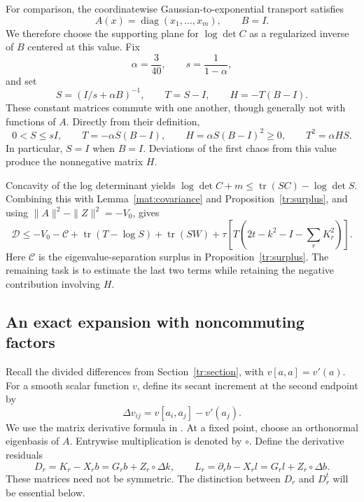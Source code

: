 \documentclass[11pt]{article}
\newcommand{\mathscr}[1]{\mathcal{#1}}
\DeclareMathOperator{\tr}{tr}
\newcommand{\Id}{I}
\theoremstyle{definition}
\theoremstyle{remark}
\numberwithin{equation}{section}
\begin{document}
For comparison, the coordinatewise Gaussian-to-exponential transport
satisfies
\[
 A(x)=\operatorname{diag}(x_1,\ldots,x_m),\qquad B=\Id.
\]
We therefore choose the supporting plane for $\log\det C$ as a
regularized inverse of $B$ centered at this value.  Fix
\begin{equation}\label{mat:dual-constants}
 \alpha=\frac{3}{40},\qquad s=\frac1{1-\alpha},
\end{equation}
and set
\begin{equation}\label{mat:dual-matrices}
 S=(\Id/s+\alpha B)^{-1},\qquad T=S-\Id,
 \qquad H=-T(B-\Id).
\end{equation}
These constant matrices commute with one another, though generally not
with functions of $A$.  Directly from their definition,
\begin{equation}\label{mat:dual-relations}
 0<S\le s\Id,\qquad T=-\alpha S(B-\Id),\qquad
 H=\alpha S(B-\Id)^2\ge0,\qquad T^2=\alpha HS.
\end{equation}
In particular, $S=\Id$ when $B=\Id$.  Deviations of the first chaos from
this value produce the nonnegative matrix $H$.

Concavity of the log determinant yields
$\log\det C+m\le\tr(SC)-\log\det S$.  Combining this with
Lemma~\ref{mat:covariance} and Proposition~\ref{tr:surplus}, and using
$\|A\|^2-\|Z\|^2=-V_0$, gives
\begin{equation}\label{mat:deficit-reduction}
 \mathscr D\le -V_0-\mathcal C+\tr(T-\log S)+\tr(SW)
   +\tau\left[T\left(2t-k^2-\Id-\sum_rK_r^2\right)\right].
\end{equation}
Here $\mathcal C$ is the eigenvalue-separation surplus in
Proposition~\ref{tr:surplus}.  The remaining task is to estimate the last
two terms while retaining the negative contribution involving $H$.

\subsection{An exact expansion with noncommuting factors}

Recall the divided differences from Section~\ref{tr:section}, with
$v[a,a]=v'(a)$.  For a smooth scalar function $v$, define its secant
increment at the second endpoint by
\[
 \Delta v_{ij}=v[a_i,a_j]-v'(a_j).
\]
We use the matrix derivative formula in
\cite[Section~2.4]{Noferini2017}.
At a fixed point, choose an orthonormal eigenbasis of $A$.  Entrywise
multiplication is denoted by $\circ$.  Define the derivative residuals
\begin{equation}\label{mat:residuals}
 D_r=K_r-X_rb=G_rb+Z_r\circ\Delta k,\qquad
 L_r=\partial_rb-X_rl=G_rl+Z_r\circ\Delta b.
\end{equation}
These matrices need not be symmetric.  The distinction between $D_r$
and $D_r^t$ will be essential below.
\end{document}
